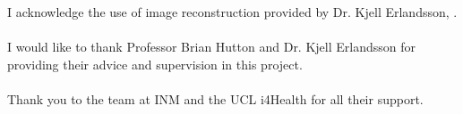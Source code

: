 \begin{acknowledgements}
I acknowledge the use of image reconstruction provided by Dr. Kjell Erlandsson, \cite{8069508}.
\paragraph{}
I would like to thank Professor Brian Hutton and Dr. Kjell Erlandsson for providing their advice and supervision in this project. 
\paragraph{}
Thank you to the team at INM and the UCL i4Health for all their support. 
\end{acknowledgements}

\setcounter{tocdepth}{2} 

\tableofcontents
\listoffigures
 \listoftables
%
\printglossaries
